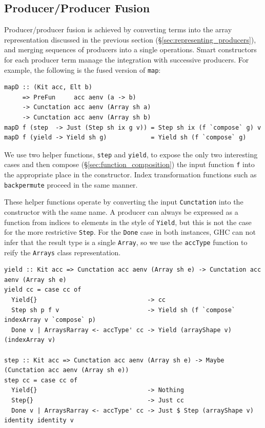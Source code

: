 \subsection{Producer/Producer Fusion}
\label{sec:producer_producer_fusion}

Producer/producer fusion is achieved by converting terms into the array
representation discussed in the previous section
(\S\ref{sec:representing_producers}), and merging sequences of producers into a
single operations. Smart constructors for each producer term manage the
integration with successive producers. For example, the following is the fused
version of \texttt{map}:
%
\begin{lstlisting}[style=haskell,
    caption={Fused definition of the \texttt{map} operation}]
mapD :: (Kit acc, Elt b)
     => PreFun     acc aenv (a -> b)
     -> Cunctation acc aenv (Array sh a)
     -> Cunctation acc aenv (Array sh b)
mapD f (step  -> Just (Step sh ix g v)) = Step sh ix (f `compose` g) v
mapD f (yield -> Yield sh g)            = Yield sh (f `compose` g)
\end{lstlisting}

We use two helper functions, \texttt{step} and \texttt{yield}, to expose the
only two interesting cases and then compose (\S\ref{sec:function_composition})
the input function \texttt{f} into the appropriate place in the constructor.
Index transformation functions such as \texttt{backpermute} proceed in the same
manner.

These helper functions operate by converting the input \texttt{Cunctation} into
the constructor with the same name. A producer can always be expressed as a
function from indices to elements in the style of \texttt{Yield}, but this is
not the case for the more restrictive \texttt{Step}. For the \texttt{Done} case
in both instances, GHC can not infer that the result type is a single
\texttt{Array}, so we use the \texttt{accType} function to reify the
\texttt{Arrays} class representation.
%
\begin{lstlisting}[style=haskell]
yield :: Kit acc => Cunctation acc aenv (Array sh e) -> Cunctation acc aenv (Array sh e)
yield cc = case cc of
  Yield{}                              -> cc
  Step sh p f v                        -> Yield sh (f `compose` indexArray v `compose` p)
  Done v | ArraysRarray <- accType' cc -> Yield (arrayShape v) (indexArray v)

step :: Kit acc => Cunctation acc aenv (Array sh e) -> Maybe (Cunctation acc aenv (Array sh e))
step cc = case cc of
  Yield{}                              -> Nothing
  Step{}                               -> Just cc
  Done v | ArraysRarray <- accType' cc -> Just $ Step (arrayShape v) identity identity v
\end{lstlisting}

